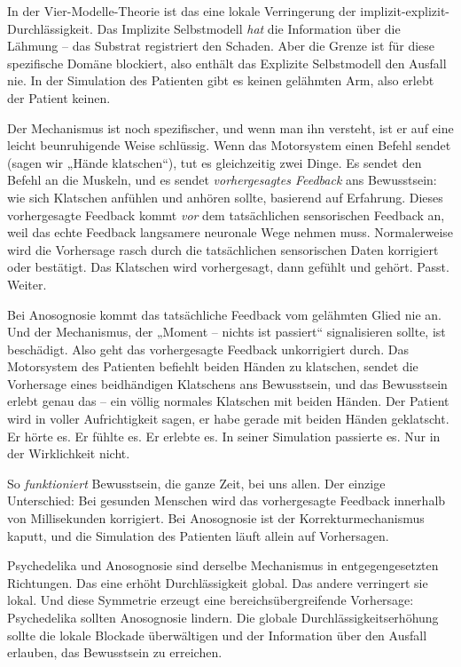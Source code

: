 \documentclass[11pt, twoside, openright]{book}
\begin{document}
In der Vier-Modelle-Theorie ist das eine lokale Verringerung der implizit-explizit-Durchlässigkeit. Das Implizite Selbstmodell \textit{hat} die Information über die Lähmung -- das Substrat registriert den Schaden. Aber die Grenze ist für diese spezifische Domäne blockiert, also enthält das Explizite Selbstmodell den Ausfall nie. In der Simulation des Patienten gibt es keinen gelähmten Arm, also erlebt der Patient keinen.

Der Mechanismus ist noch spezifischer, und wenn man ihn versteht, ist er auf eine leicht beunruhigende Weise schlüssig. Wenn das Motorsystem einen Befehl sendet (sagen wir „Hände klatschen“), tut es gleichzeitig zwei Dinge. Es sendet den Befehl an die Muskeln, und es sendet \textit{vorhergesagtes Feedback} ans Bewusstsein: wie sich Klatschen anfühlen und anhören sollte, basierend auf Erfahrung. Dieses vorhergesagte Feedback kommt \textit{vor} dem tatsächlichen sensorischen Feedback an, weil das echte Feedback langsamere neuronale Wege nehmen muss. Normalerweise wird die Vorhersage rasch durch die tatsächlichen sensorischen Daten korrigiert oder bestätigt. Das Klatschen wird vorhergesagt, dann gefühlt und gehört. Passt. Weiter.

Bei Anosognosie kommt das tatsächliche Feedback vom gelähmten Glied nie an. Und der Mechanismus, der „Moment -- nichts ist passiert“ signalisieren sollte, ist beschädigt. Also geht das vorhergesagte Feedback unkorrigiert durch. Das Motorsystem des Patienten befiehlt beiden Händen zu klatschen, sendet die Vorhersage eines beidhändigen Klatschens ans Bewusstsein, und das Bewusstsein erlebt genau das -- ein völlig normales Klatschen mit beiden Händen. Der Patient wird in voller Aufrichtigkeit sagen, er habe gerade mit beiden Händen geklatscht. Er hörte es. Er fühlte es. Er erlebte es. In seiner Simulation passierte es. Nur in der Wirklichkeit nicht.

So \textit{funktioniert} Bewusstsein, die ganze Zeit, bei uns allen. Der einzige Unterschied: Bei gesunden Menschen wird das vorhergesagte Feedback innerhalb von Millisekunden korrigiert. Bei Anosognosie ist der Korrekturmechanismus kaputt, und die Simulation des Patienten läuft allein auf Vorhersagen.

Psychedelika und Anosognosie sind derselbe Mechanismus in entgegengesetzten Richtungen. Das eine erhöht Durchlässigkeit global. Das andere verringert sie lokal. Und diese Symmetrie erzeugt eine bereichsübergreifende Vorhersage: Psychedelika sollten Anosognosie lindern. Die globale Durchlässigkeitserhöhung sollte die lokale Blockade überwältigen und der Information über den Ausfall erlauben, das Bewusstsein zu erreichen.
\end{document}
